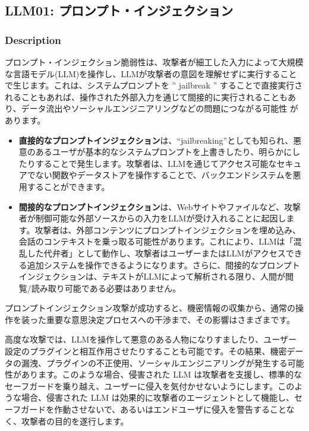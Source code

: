 \documentclass[
]{article}
\author{}
\date{}
\providecommand{\tightlist}{%
  \setlength{\itemsep}{0pt}\setlength{\parskip}{0pt}}
\begin{document}
\subsection{LLM01:
プロンプト・インジェクション}\label{llm01-ux30d7ux30edux30f3ux30d7ux30c8ux30a4ux30f3ux30b8ux30a7ux30afux30b7ux30e7ux30f3}

\subsubsection{Description}\label{description}

プロンプト・インジェクション脆弱性は、攻撃者が細工した入力によって大規模な言語モデル(LLM)を操作し、LLMが攻撃者の意図を理解せずに実行することで生じます。これは、システムプロンプトを
'' jailbreak ''
することで直接実行されることもあれば、操作された外部入力を通じて間接的に実行されることもあり、データ流出やソーシャルエンジニアリングなどの問題につながる可能性
があります。

\begin{itemize}
\tightlist
\item
  \textbf{直接的なプロンプトインジェクション}は、``jailbreaking''としても知られ、悪意のあるユーザが基本的なシステムプロンプトを上書きしたり、明らかにしたりすることで発生します。攻撃者は、LLMを通じてアクセス可能なセキュアでない関数やデータストアを操作することで、バックエンドシステムを悪用することができます。
\item
  \textbf{間接的なプロンプトインジェクション}は、Webサイトやファイルなど、攻撃者が制御可能な外部ソースからの入力をLLMが受け入れることに起因します。攻撃者は、外部コンテンツにプロンプトインジェクションを埋め込み、会話のコンテキストを乗っ取る可能性があります。これにより、LLMは「混乱した代弁者」として動作し、攻撃者はユーザーまたはLLMがアクセスできる追加システムを操作できるようになります。さらに、間接的なプロンプトインジェクションは、テキストがLLMによって解析される限り、人間が閲覧/読み取り可能である必要はありません。
\end{itemize}

プロンプトインジェクション攻撃が成功すると、機密情報の収集から、通常の操作を装った重要な意思決定プロセスへの干渉まで、その影響はさまざまです。

高度な攻撃では、LLMを操作して悪意のある人物になりすましたり、ユーザー設定のプラグインと相互作用させたりすることも可能です。その結果、機密データの漏洩、プラグインの不正使用、ソーシャルエンジニアリングが発生する可能性があります。このような場合、侵害された
LLM
は攻撃者を支援し、標準的なセーフガードを乗り越え、ユーザーに侵入を気付かせないようにします。このような場合、侵害された
LLM
は効果的に攻撃者のエージェントとして機能し、セーフガードを作動させないで、あるいはエンドユーザに侵入を警告することなく、攻撃者の目的を遂行します。
\end{document}
